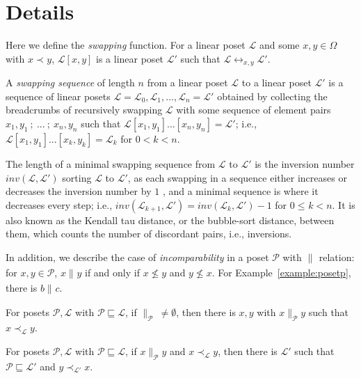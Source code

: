 \documentclass[12pt]{llncs}
\let\oldleq\leq
\renewcommand{\leq}[1][]{\oldleq_{#1}}
\newcommand{\poset}[1]{\mathcal{#1}}
\newcommand{\uni}[1][]{\Omega_{#1}}
\newcommand{\swap}[1][]{\leftrightarrow_{#1}}
\newcommand{\lext}{\sqsubseteq}
\newcommand{\incomp}[1][]{\parallel_{#1}}
\newcommand{\covered}[1][]{\prec_{#1}}
\newcommand{\swapfn}[2]{#1[#2]}
\newcommand{\inv}[2]{inv(#1,#2)}
\begin{document}
\appendix
\renewcommand{\thesection}{\appendixname~\Alph{section}}
\section{Details}
\label{appendix:connected-proof}
Here we define the \emph{swapping} function. For a linear poset $\poset{L}$ and some $x,y \!\in\! \uni$ with $x \covered y$, $\swapfn{\poset{L}}{x,y}$ is a linear poset $\poset{L}'$ such that $\poset{L} \swap[x,y] \poset{L}'$.

A \emph{swapping sequence} of length $n$ from a linear poset $\poset{L}$ to a linear poset $\poset{L}'$ is a sequence of linear posets $\poset{L} = \poset{L}_0, \poset{L}_1, ... , \poset{L}_n = \poset{L}'$ obtained by collecting the breadcrumbs of recursively swapping $\poset{L}$ with some sequence of element pairs $x_1,y_1 \ ;\  ... \ ;\  x_n,y_n$ such that $\swapfn{\poset{L}}{x_1,y_1} ... [x_n,y_n] = \poset{L}'$; i.e., $\swapfn{\poset{L}}{x_1,y_1} ... [x_k,y_k] = \poset{L}_k$ for $0 < k < n$.

The length of a minimal swapping sequence from $\poset{L}$ to $\poset{L}'$ is the inversion number $\inv{\poset{L}}{\poset{L}'}$ sorting $\poset{L}$ to $\poset{L}'$, as each swapping in a sequence either increases or decreases the inversion number by $1$ \cite{ruskey1992generating}, and a minimal sequence is where it decreases every step; i.e., $\inv{\poset{L}_{k+1}}{\poset{L}'} = \inv{\poset{L}_k}{\poset{L}'} - 1$ for $0 \leq k < n$. It is also known as the Kendall tau distance, or the bubble-sort distance, between them, which counts the number of discordant pairs, i.e., inversions.

In addition, we describe the case of \emph{incomparability} in a poset $\poset{P}$ with $\incomp$ relation: for $x, y \!\in\! \poset{P}$, $x \incomp y$ if and only if $x \nleq y$ and $y \nleq x$. For Example~\ref{example:posetp}, there is $b \incomp c$.

\begin{lemma}
    For posets $\poset{P},\poset{L}$ with $\poset{P} \lext \poset{L}$, if $\incomp[\poset{P}]\> \neq \emptyset$, then there is $x,y$ with $x \incomp[\poset{P}] y$ such that $x \covered[\poset{L}] y$.
\end{lemma}

\begin{lemma}
    For posets $\poset{P},\poset{L}$ with $\poset{P} \lext \poset{L}$, if $x \incomp[\poset{P}] y$ and $x \covered[\poset{L}] y$, then there is $\poset{L}'$ such that $\poset{P} \lext \poset{L}'$ and $y \covered[\poset{L}'] x$.
\end{lemma}
\end{document}
